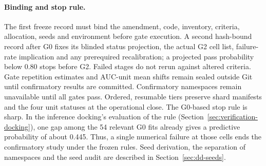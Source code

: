 \paragraph{Binding and stop rule.}
The first freeze record must bind the amendment, code, inventory, criteria, allocation, seeds and environment before gate execution. A second hash-bound record after G0 fixes its blinded status projection, the actual G2 cell list, failure-rate implication and any prerequired recalibration; a projected pass probability below 0.80 stops before G2. Failed stages do not rerun against altered criteria. Gate repetition estimates and AUC-unit mean shifts remain sealed outside Git until confirmatory results are committed. Confirmatory namespaces remain unavailable until all gates pass. Ordered, resumable tiers preserve shard manifests and the four unit statuses at the operational close.
The G0-based stop rule is sharp. In the inference docking's evaluation of the rule (Section~\ref{sec:verification-docking}), one gap among the 54 relevant G0 fits already gives a predictive probability of about 0.445. Thus, a single numerical failure at those cells ends the confirmatory study under the frozen rules. %
Seed derivation, the separation of namespaces and the seed audit are described in Section~\ref{sec:dd-seeds}.

